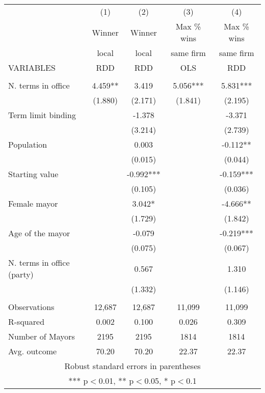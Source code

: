\documentclass[]{article}
\begin{document}
\begin{tabular}{lcccc} \hline
 & (1) & (2) & (3) & (4) \\
 & Winner & Winner & Max \% wins & Max \% wins \\
 & local & local & same firm & same firm \\
VARIABLES & RDD & RDD & OLS & RDD \\ \hline
 &  &  &  &  \\
N. terms in office & 4.459** & 3.419 & 5.056*** & 5.831*** \\
 & (1.880) & (2.171) & (1.841) & (2.195) \\
Term limit binding &  & -1.378 &  & -3.371 \\
 &  & (3.214) &  & (2.739) \\
Population &  & 0.003 &  & -0.112** \\
 &  & (0.015) &  & (0.044) \\
Starting value &  & -0.992*** &  & -0.159*** \\
 &  & (0.105) &  & (0.036) \\
Female mayor &  & 3.042* &  & -4.666** \\
 &  & (1.729) &  & (1.842) \\
Age of the mayor &  & -0.079 &  & -0.219*** \\
 &  & (0.075) &  & (0.067) \\
N. terms in office (party) &  & 0.567 &  & 1.310 \\
 &  & (1.332) &  & (1.146) \\
 &  &  &  &  \\
Observations & 12,687 & 12,687 & 11,099 & 11,099 \\
R-squared & 0.002 & 0.100 & 0.026 & 0.309 \\
Number of Mayors & 2195 & 2195 & 1814 & 1814 \\
 Avg. outcome & 70.20 & 70.20 & 22.37 & 22.37 \\ \hline
\multicolumn{5}{c}{ Robust standard errors in parentheses} \\
\multicolumn{5}{c}{ *** p$<$0.01, ** p$<$0.05, * p$<$0.1} \\
\end{tabular}
\end{document}
